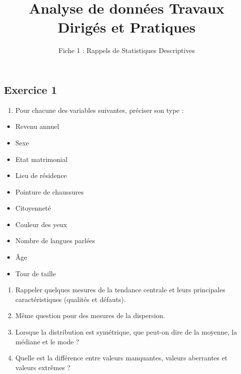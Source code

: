 \documentclass[
]{article}
\title{Analyse de données Travaux Dirigés et Pratiques}
\author{Fiche 1 : Rappels de Statistiques Descriptives}
\date{}
\providecommand{\tightlist}{%
  \setlength{\itemsep}{0pt}\setlength{\parskip}{0pt}}
\begin{document}
\maketitle

\subsection{Exercice 1}\label{exercice-1}

\begin{enumerate}
\def\labelenumi{\arabic{enumi}.}
\tightlist
\item
  Pour chacune des variables suivantes, préciser son type :
\end{enumerate}

\begin{minipage}[t]{0.5\textwidth}
\begin{itemize}
\item Revenu annuel           
\item Sexe                    
\item Etat matrimonial        
\item Lieu de résidence       
\item Pointure de chaussures 
\end{itemize}
\end{minipage}
\begin{minipage}[t]{0.5\textwidth}
\begin{itemize}
\item Citoyenneté
\item Couleur des yeux
\item Nombre de langues parlées
\item Âge
\item Tour de taille
\end{itemize}
\end{minipage}

\begin{enumerate}
\def\labelenumi{\arabic{enumi}.}
\setcounter{enumi}{1}
\item
  Rappeler quelques mesures de la tendance centrale et leurs principales
  caractéristiques (qualités et défauts).
\item
  Même question pour des mesures de la dispersion.
\item
  Lorsque la distribution est symétrique, que peut-on dire de la
  moyenne, la médiane et le mode ?
\item
  Quelle est la différence entre valeurs manquantes, valeurs aberrantes
  et valeurs extrêmes ?
\end{enumerate}
\end{document}
